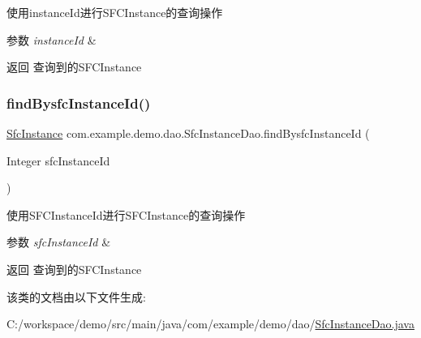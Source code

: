 使用instance\+Id进行\+S\+F\+C\+Instance的查询操作 
\begin{DoxyParams}{参数}
{\em instance\+Id} & \\
\hline
\end{DoxyParams}
\begin{DoxyReturn}{返回}
查询到的\+S\+F\+C\+Instance 
\end{DoxyReturn}
\mbox{\label{interfacecom_1_1example_1_1demo_1_1dao_1_1_sfc_instance_dao_a80f5c670dd6055d25f4b54823f7344f7}} 
\subsubsection{\texorpdfstring{find\+Bysfc\+Instance\+Id()}{findBysfcInstanceId()}}
{\footnotesize\ttfamily \mbox{\hyperlink{classcom_1_1example_1_1demo_1_1modular_1_1_sfc_instance}{Sfc\+Instance}} com.\+example.\+demo.\+dao.\+Sfc\+Instance\+Dao.\+find\+Bysfc\+Instance\+Id (\begin{DoxyParamCaption}\item[{Integer}]{sfc\+Instance\+Id }\end{DoxyParamCaption})}

使用\+S\+F\+C\+Instance\+Id进行\+S\+F\+C\+Instance的查询操作 
\begin{DoxyParams}{参数}
{\em sfc\+Instance\+Id} & \\
\hline
\end{DoxyParams}
\begin{DoxyReturn}{返回}
查询到的\+S\+F\+C\+Instance 
\end{DoxyReturn}


该类的文档由以下文件生成\+:\begin{DoxyCompactItemize}
\item 
C\+:/workspace/demo/src/main/java/com/example/demo/dao/\mbox{\hyperlink{_sfc_instance_dao_8java}{Sfc\+Instance\+Dao.\+java}}\end{DoxyCompactItemize}
